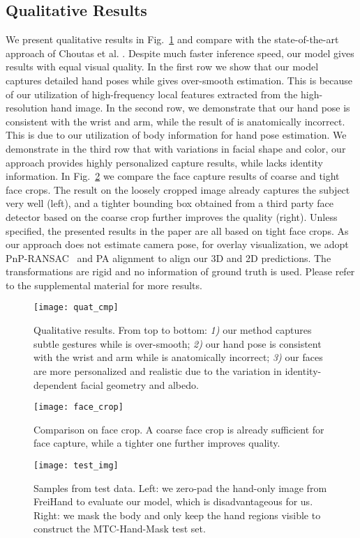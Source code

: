 \documentclass[final]{cvpr}
\begin{document}
 \subsection{Qualitative Results}
We present qualitative results in Fig.~\ref{fig:quat_cmp} and compare with the state-of-the-art approach of Choutas et al. \cite{choutas2020monocular}.
Despite much faster inference speed, our model gives results with equal visual quality.
In the first row we show that our model captures detailed hand poses while \cite{choutas2020monocular} gives over-smooth estimation.
This is because of our utilization of high-frequency local features extracted from the high-resolution hand image.
In the second row, we demonstrate that our hand pose is consistent with the wrist and arm, while the result of \cite{choutas2020monocular} is anatomically incorrect.
This is due to our utilization of body information for hand pose estimation.
We demonstrate in the third row that with variations in facial shape and color, our approach provides highly personalized capture results, while \cite{choutas2020monocular} lacks identity information.
In Fig.~\ref{fig:face_crop} we compare the face capture results of coarse and tight face crops.
The result on the loosely cropped image already captures the subject very well (left), and a tighter bounding box obtained from a third party face detector \cite{king2009dlib} based on the coarse crop further improves the quality (right).
Unless specified, the presented results in the paper are all based on tight face crops.
As our approach does not estimate camera pose, for overlay visualization, we adopt PnP-RANSAC~\cite{fischler1981random} and PA alignment to align our 3D and 2D predictions.
The transformations are rigid and no information of ground truth is used.
Please refer to the supplemental material for more results.
\begin{figure}[t]
  \centering
  \texttt{[image: quat\_cmp]}
  \caption{
Qualitative results.
From top to bottom:
\textit{1)} our method captures subtle gestures while \cite{choutas2020monocular} is over-smooth;
\textit{2)} our hand pose is consistent with the wrist and arm while \cite{choutas2020monocular} is anatomically incorrect;
\textit{3)} our faces are more personalized and realistic due to the variation in identity-dependent facial geometry and albedo.
}
  \label{fig:quat_cmp}
\end{figure}
\begin{figure}[t]
  \centering
  \texttt{[image: face\_crop]}
  \caption{
Comparison on face crop.
A coarse face crop is already sufficient for face capture, while a tighter one further improves quality.
}
  \label{fig:face_crop}
\end{figure}
\begin{figure}[t]
  \centering
  \texttt{[image: test\_img]}
  \caption{
Samples from test data.
Left: we zero-pad the hand-only image from FreiHand to evaluate our model, which is disadvantageous for us.
Right: we mask the body and only keep the hand regions visible to construct the MTC-Hand-Mask test set.
}
  \label{fig:test_img}
\end{figure}
\end{document}
